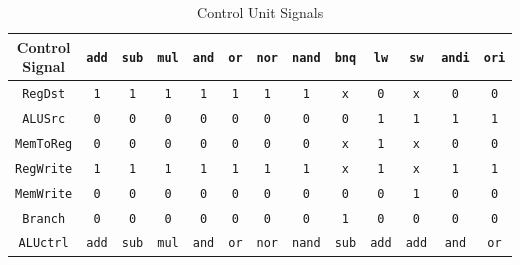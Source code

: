 \documentclass[12pt, dvipsnames, svgnames, x11names, oneside]{book}
\begin{document}
		\begin{table}
			\caption{Control Unit Signals}
			\begin{center}
				\begin{tabular}{|c|c|c|c|c|c|c|c|c|c|c|c|c|}
					\hline
					Control Signal &
					\texttt{add} &
					\texttt{sub} &
					\texttt{mul} &
					\texttt{and} &
					\texttt{or} &
					\texttt{nor} &
					\texttt{nand} &
					\texttt{bnq} &
					\texttt{lw} &
					\texttt{sw} &
					\texttt{andi} &
					\texttt{ori} \\
					\hline
					\hline
					\texttt{RegDst} & 
					\texttt{1} &
					\texttt{1} &
					\texttt{1} &
					\texttt{1} &
					\texttt{1} &
					\texttt{1} &
					\texttt{1} &
					\texttt{x} &
					\texttt{0} &
					\texttt{x} &
					\texttt{0} &
					\texttt{0} \\
					\hline
					\texttt{ALUSrc} &
					\texttt{0} &
					\texttt{0} &
					\texttt{0} &
					\texttt{0} &
					\texttt{0} &
					\texttt{0} &
					\texttt{0} &
					\texttt{0} &
					\texttt{1} &
					\texttt{1} &
					\texttt{1} &
					\texttt{1} \\ 
					\hline
					\texttt{MemToReg} &
					\texttt{0} &
					\texttt{0} &
					\texttt{0} &
					\texttt{0} &
					\texttt{0} &
					\texttt{0} &
					\texttt{0} &
					\texttt{x} &
					\texttt{1} &
					\texttt{x} &
					\texttt{0} &
					\texttt{0} \\ 
					\hline
					\texttt{RegWrite} &
					\texttt{1} &
					\texttt{1} &
					\texttt{1} &
					\texttt{1} &
					\texttt{1} &
					\texttt{1} &
					\texttt{1} &
					\texttt{x} &
					\texttt{1} &
					\texttt{x} &
					\texttt{1} &
					\texttt{1} \\ 
					\hline
					\texttt{MemWrite} &
					\texttt{0} &
					\texttt{0} &
					\texttt{0} &
					\texttt{0} &
					\texttt{0} &
					\texttt{0} &
					\texttt{0} &
					\texttt{0} &
					\texttt{0} &
					\texttt{1} &
					\texttt{0} &
					\texttt{0} \\ 
					\hline
					\texttt{Branch} &
					\texttt{0} &
					\texttt{0} &
					\texttt{0} &
					\texttt{0} &
					\texttt{0} &
					\texttt{0} &
					\texttt{0} &
					\texttt{1} &
					\texttt{0} &
					\texttt{0} &
					\texttt{0} &
					\texttt{0} \\ 
					\hline
					\texttt{ALUctrl} &
					\texttt{add} &
					\texttt{sub} &
					\texttt{mul} &
					\texttt{and} &
					\texttt{or} &
					\texttt{nor} &
					\texttt{nand} &
					\texttt{sub} &
					\texttt{add} &
					\texttt{add} &
					\texttt{and} &
					\texttt{or} \\ 
					\hline
				\end{tabular}
			\end{center}
		\end{table}\label{sec:table:cu}
	
\end{document}

